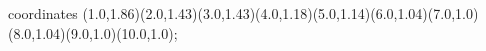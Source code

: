 					coordinates { (1.0,1.86)(2.0,1.43)(3.0,1.43)(4.0,1.18)(5.0,1.14)(6.0,1.04)(7.0,1.0)(8.0,1.04)(9.0,1.0)(10.0,1.0)};